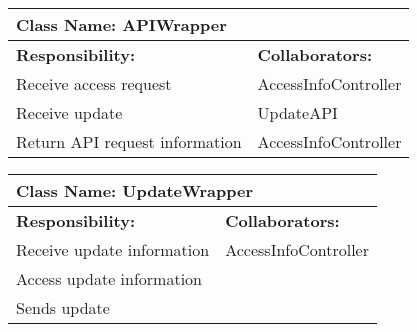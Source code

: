 \documentclass[]{article}
\begin{document}
	\begin{table}[ht]
		\centering
		\begin{tabular}{|p{5cm}|p{5cm}|}
			\hline 
			\multicolumn{2}{|l|}{\textbf{Class Name: APIWrapper}} \\
			\hline
			\textbf{Responsibility:} & \textbf{Collaborators:} \\
			\hline
			Receive access request  & AccessInfoController\\
			\hline
			Receive update & UpdateAPI\\
			\hline
			Return API request information & AccessInfoController\\
			\hline
		\end{tabular}
	\end{table}	
	
	\begin{table}[ht]
		\centering
		\begin{tabular}{|p{5cm}|p{5cm}|}
			\hline 
			\multicolumn{2}{|l|}{\textbf{Class Name: UpdateWrapper}} \\
			\hline
			\textbf{Responsibility:} & \textbf{Collaborators:} \\
			\hline
			Receive update information  & AccessInfoController\\
			\hline
			Access update information & \\
			\hline
			Sends update & \\
			\hline
		\end{tabular}
	\end{table}
\newpage	


\newpage
\clearpage
\appendix
\end{document}
